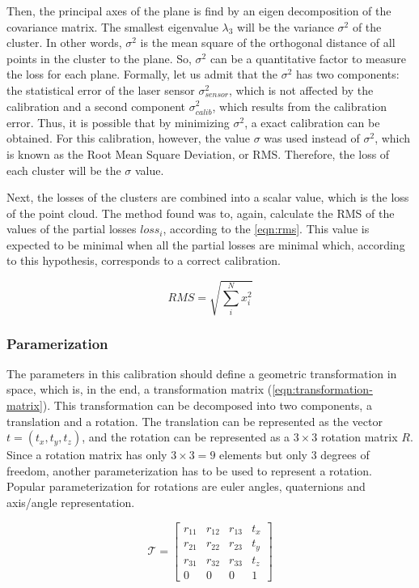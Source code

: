 Then, the principal axes of the plane is find by an eigen decomposition of the covariance matrix. The smallest eigenvalue $\lambda_3$ will be the variance $\sigma^2$ of the cluster. In other words, $\sigma^2$ is the mean square of the orthogonal distance of all points in the cluster to the plane. So, $\sigma^2$ can be a quantitative factor to measure the loss for each plane. Formally, let us admit that the $\sigma^2$ has two components: the statistical error of the laser sensor $\sigma^2_{sensor}$, which is not affected by the calibration and a second component $\sigma^2_{calib}$, which results from the calibration error. Thus, it is possible that by minimizing $\sigma^2$, a exact calibration can be obtained. For this calibration, however, the value $\sigma$ was used instead of $\sigma^2$, which is known as the Root Mean Square Deviation, or RMS. Therefore, the loss of each cluster will be the $\sigma$ value.

Next, the losses of the clusters are combined into a scalar value, which is the loss of the point cloud. The method found was to, again, calculate the RMS of the values of the partial losses $loss_i$, according to the \cref{eqn:rms}. This value is expected to be minimal when all the partial losses are minimal which, according to this hypothesis, corresponds to a correct calibration.

\begin{equation}
    \label{eqn:rms}
    RMS = \sqrt{\sum_{i}^{N}{x_i^2}}
\end{equation}

\subsubsection{Paramerization}

The parameters in this calibration should define a geometric transformation in space, which is, in the end, a transformation matrix (\cref{eqn:transformation-matrix}). This transformation can be decomposed into two components, a translation and a rotation. The translation can be represented as the vector $t = (t_x, t_y, t_z)$, and the rotation can be represented as a $3 \times 3$ rotation matrix $R$. Since a rotation matrix has only $3 \times 3 = 9$ elements but only 3 degrees of freedom, another parameterization has to be used to represent a rotation. Popular parameterization for rotations are euler angles, quaternions and axis/angle representation. 

\begin{equation}
    \label{eqn:transformation-matrix}
    \mathcal{T} = \left[
        \begin{array}{cccc}
            r_{11} & r_{12} & r_{13} & t_x \\
            r_{21} & r_{22} & r_{23} & t_y \\
            r_{31} & r_{32} & r_{33} & t_z \\
            0      & 0      & 0      & 1   
        \end{array}
    \right]
\end{equation}

